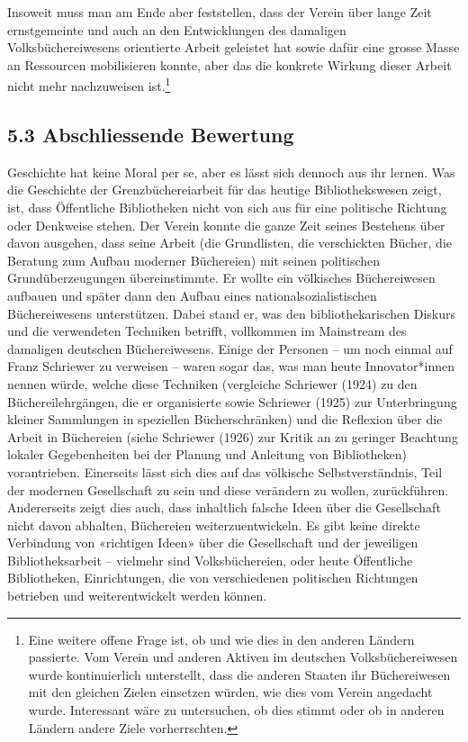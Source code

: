 \documentclass[a4paper,
fontsize=11pt,
oneside,
numbers=noperiodatend,
parskip=half-,
bibliography=totoc,
final
]{scrartcl}
\begin{document}
Insoweit muss man am Ende aber feststellen, dass der Verein über lange
Zeit ernstgemeinte und auch an den Entwicklungen des damaligen
Volksbüchereiwesens orientierte Arbeit geleistet hat sowie dafür eine
grosse Masse an Ressourcen mobilisieren konnte, aber das die konkrete
Wirkung dieser Arbeit nicht mehr nachzuweisen ist.\footnote{Eine weitere
  offene Frage ist, ob und wie dies in den anderen Ländern passierte.
  Vom Verein und anderen Aktiven im deutschen Volksbüchereiwesen wurde
  kontinuierlich unterstellt, dass die anderen Staaten ihr Büchereiwesen
  mit den gleichen Zielen einsetzen würden, wie dies vom Verein
  angedacht wurde. Interessant wäre zu untersuchen, ob dies stimmt oder
  ob in anderen Ländern andere Ziele vorherrschten.}

\hypertarget{abschliessende-bewertung}{%
\subsection{5.3 Abschliessende
Bewertung}\label{abschliessende-bewertung}}

Geschichte hat keine Moral per se, aber es lässt sich dennoch aus ihr
lernen. Was die Geschichte der Grenzbüchereiarbeit für das heutige
Bibliothekswesen zeigt, ist, dass Öffentliche Bibliotheken nicht von
sich aus für eine politische Richtung oder Denkweise stehen. Der Verein
konnte die ganze Zeit seines Bestehens über davon ausgehen, dass seine
Arbeit (die Grundlisten, die verschickten Bücher, die Beratung zum
Aufbau moderner Büchereien) mit seinen politischen Grundüberzeugungen
übereinstimmte. Er wollte ein völkisches Büchereiwesen aufbauen und
später dann den Aufbau eines nationalsozialistischen Büchereiwesens
unterstützen. Dabei stand er, was den bibliothekarischen Diskurs und die
verwendeten Techniken betrifft, vollkommen im Mainstream des damaligen
deutschen Büchereiwesens. Einige der Personen -- um noch einmal auf
Franz Schriewer zu verweisen -- waren sogar das, was man heute
Innovator*innen nennen würde, welche diese Techniken (vergleiche
Schriewer (1924) zu den Büchereilehrgängen, die er organisierte sowie
Schriewer (1925) zur Unterbringung kleiner Sammlungen in speziellen
Bücherschränken) und die Reflexion über die Arbeit in Büchereien (siehe
Schriewer (1926) zur Kritik an zu geringer Beachtung lokaler
Gegebenheiten bei der Planung und Anleitung von Bibliotheken)
vorantrieben. Einerseits lässt sich dies auf das völkische
Selbstverständnis, Teil der modernen Gesellschaft zu sein und diese
verändern zu wollen, zurückführen. Andererseits zeigt dies auch, dass
inhaltlich falsche Ideen über die Gesellschaft nicht davon abhalten,
Büchereien weiterzuentwickeln. Es gibt keine direkte Verbindung von
«richtigen Ideen» über die Gesellschaft und der jeweiligen
Bibliotheksarbeit -- vielmehr sind Volksbüchereien, oder heute
Öffentliche Bibliotheken, Einrichtungen, die von verschiedenen
politischen Richtungen betrieben und weiterentwickelt werden können.
\end{document}
